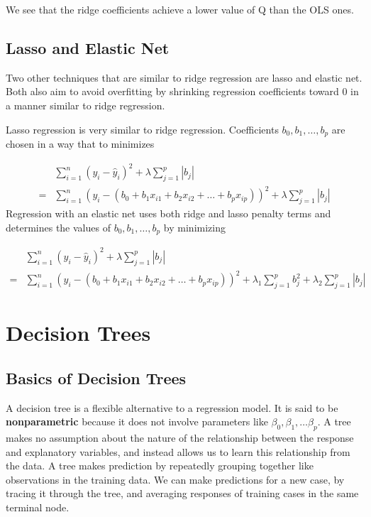\documentclass[
  letterpaper,
  DIV=11,
  numbers=noendperiod]{scrreprt}
\begin{document}
We see that the ridge coefficients achieve a lower value of Q than the
OLS ones.

\subsection{Lasso and Elastic Net}\label{lasso-and-elastic-net}

Two other techniques that are similar to ridge regression are lasso and
elastic net. Both also aim to avoid overfitting by shrinking regression
coefficients toward 0 in a manner similar to ridge regression.

Lasso regression is very similar to ridge regression. Coefficients
\(b_0, b_1, \ldots, b_p\) are chosen in a way that to minimizes

\[
\begin{aligned}
& \displaystyle\sum_{i=1}^n (y_i -\hat{y}_i)^2  + \lambda\displaystyle\sum_{j=1}^p|b_j|\\ =  & \displaystyle\sum_{i=1}^n (y_i -(b_0 + b_1x_{i1} + b_2x_{i2} + \ldots + b_px_{ip}))^2 + \lambda\displaystyle\sum_{j=1}^p|b_j|
\end{aligned}
\] Regression with an elastic net uses both ridge and lasso penalty
terms and determines the values of \(b_0, b_1, \ldots, b_p\) by
minimizing

\[
\begin{aligned}
& \displaystyle\sum_{i=1}^n (y_i -\hat{y}_i)^2  + \lambda\displaystyle\sum_{j=1}^p|b_j|\\ =  & \displaystyle\sum_{i=1}^n (y_i -(b_0 + b_1x_{i1} + b_2x_{i2} + \ldots + b_px_{ip}))^2 + \lambda_1\displaystyle\sum_{j=1}^pb_j^2+ \lambda_2\displaystyle\sum_{j=1}^p|b_j|
\end{aligned}
\]

\section{Decision Trees}\label{decision-trees}

\subsection{Basics of Decision Trees}\label{basics-of-decision-trees}

A decision tree is a flexible alternative to a regression model. It is
said to be \textbf{nonparametric} because it does not involve parameters
like \(\beta_0, \beta_1, \ldots \beta_p\). A tree makes no assumption
about the nature of the relationship between the response and
explanatory variables, and instead allows us to learn this relationship
from the data. A tree makes prediction by repeatedly grouping together
like observations in the training data. We can make predictions for a
new case, by tracing it through the tree, and averaging responses of
training cases in the same terminal node.
\end{document}

